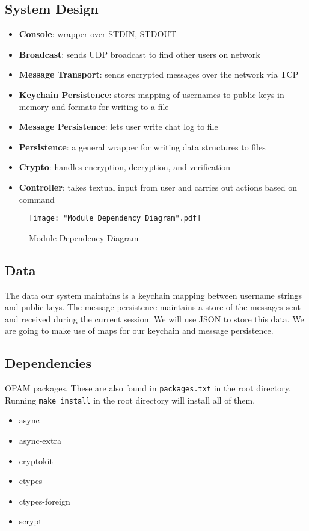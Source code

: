 \documentclass{scrartcl}
\begin{document}
\subsection{System Design}
\begin{itemize}
	\item \textbf{Console}: wrapper over STDIN, STDOUT
	\item \textbf{Broadcast}: sends UDP broadcast to find other users on network
	\item \textbf{Message Transport}: sends encrypted messages over the network via TCP
	\item \textbf{Keychain Persistence}: stores mapping of usernames to public keys in memory and formats for writing to a file
	\item \textbf{Message Persistence}: lets user write chat log to file
	\item \textbf{Persistence}: a general wrapper for writing data structures to files
	\item \textbf{Crypto}: handles encryption, decryption, and verification
	\item \textbf{Controller}: takes textual input from user and carries out actions based on command
\end{itemize}
\begin{figure}[H]
	\texttt{[image: "Module Dependency Diagram".pdf]}
	\caption{Module Dependency Diagram}
\end{figure}
\subsection{Data}

The data our system maintains is a keychain mapping between username strings and public keys. The message persistence maintains a store of the messages sent and received during the current session. We will use JSON to store this data. We are going to make use of maps for our keychain and message persistence.

\subsection{Dependencies}

OPAM packages. These are also found in  \texttt{packages.txt} in the root directory. Running \texttt{make install} in the root directory will install all of them.

\begin{itemize}
    \item async
    \item async-extra
    \item cryptokit
    \item ctypes
    \item ctypes-foreign
    \item scrypt
\end{itemize}
\end{document}
